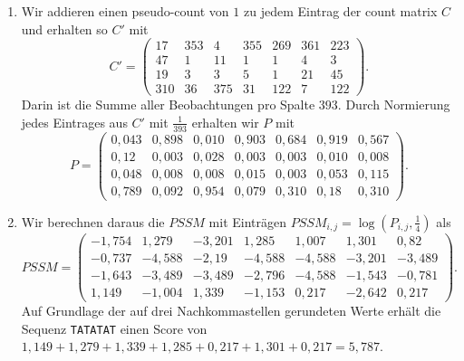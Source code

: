 \documentclass{homework}
\begin{document}
\begin{enumerate}
\begin{enumerate}
\item Wir addieren einen pseudo-count von $1$ zu jedem Eintrag der count matrix
$C$ und erhalten so $C'$ mit
$$
C' = \begin{pmatrix}
17 & 353 & 4 & 355 & 269 & 361 & 223\\
47 & 1 & 11 & 1 & 1 & 4 & 3\\
19 & 3 & 3 & 5 & 1 & 21 & 45\\
310 & 36 & 375 & 31 & 122 & 7 & 122
\end{pmatrix}.
$$
Darin ist die Summe aller Beobachtungen pro Spalte $393$. Durch Normierung jedes
Eintrages aus $C'$ mit $\frac{1}{393}$ erhalten wir $P$ mit
$$
P = \begin{pmatrix}
0,043 & 0,898 & 0,010 & 0,903 & 0,684 & 0,919 & 0,567\\
0,12 & 0,003 & 0,028 & 0,003 & 0,003 & 0,010 & 0,008\\
0,048 & 0,008 & 0,008 & 0,015 & 0,003 & 0,053 & 0,115\\
0,789 & 0,092 & 0,954 & 0,079 & 0,310 & 0,18 & 0,310
\end{pmatrix}.
$$
\item Wir berechnen daraus die $PSSM$ mit Einträgen
$PSSM_{i,j} = \log(P_{i,j}, \frac{1}{4})$ als
$$
PSSM = \begin{pmatrix}
-1,754 & 1,279 & -3,201 & 1,285 & 1,007 & 1,301 & 0,82\\
-0,737 & -4,588 & -2,19 & -4,588 & -4,588 & -3,201 & -3,489\\
-1,643 & -3,489 & -3,489 & -2,796 & -4,588 & -1,543 & -0,781\\
1,149 & -1,004 & 1,339 & -1,153 & 0,217 & -2,642 & 0,217
\end{pmatrix}.
$$
Auf Grundlage der auf drei Nachkommastellen gerundeten Werte erhält die Sequenz
\texttt{TATATAT} einen Score von $1,149 + 1,279 + 1,339 + 1,285 + 0,217 + 1,301 + 0,217 = 5,787$.
\end{enumerate}

\end{enumerate}
\end{document}
